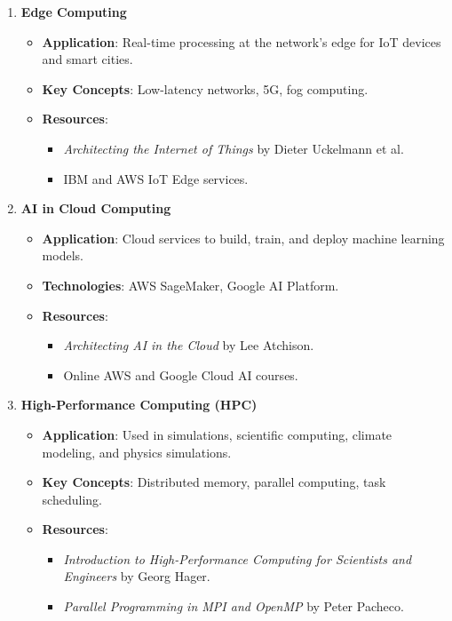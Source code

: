 \documentclass{article}
\begin{document}
\begin{enumerate}
    \item \textbf{Edge Computing}
    \begin{itemize}
        \item \textbf{Application}: Real-time processing at the network's edge for IoT devices and smart cities.
        \item \textbf{Key Concepts}: Low-latency networks, 5G, fog computing.
        \item \textbf{Resources}:
        \begin{itemize}
            \item \textit{Architecting the Internet of Things} by Dieter Uckelmann et al.
            \item IBM and AWS IoT Edge services.
        \end{itemize}
    \end{itemize}

    \item \textbf{AI in Cloud Computing}
    \begin{itemize}
        \item \textbf{Application}: Cloud services to build, train, and deploy machine learning models.
        \item \textbf{Technologies}: AWS SageMaker, Google AI Platform.
        \item \textbf{Resources}:
        \begin{itemize}
            \item \textit{Architecting AI in the Cloud} by Lee Atchison.
            \item Online AWS and Google Cloud AI courses.
        \end{itemize}
    \end{itemize}

    \item \textbf{High-Performance Computing (HPC)}
    \begin{itemize}
        \item \textbf{Application}: Used in simulations, scientific computing, climate modeling, and physics simulations.
        \item \textbf{Key Concepts}: Distributed memory, parallel computing, task scheduling.
        \item \textbf{Resources}:
        \begin{itemize}
            \item \textit{Introduction to High-Performance Computing for Scientists and Engineers} by Georg Hager.
            \item \textit{Parallel Programming in MPI and OpenMP} by Peter Pacheco.
        \end{itemize}
    \end{itemize}


\end{enumerate}
\end{document}
